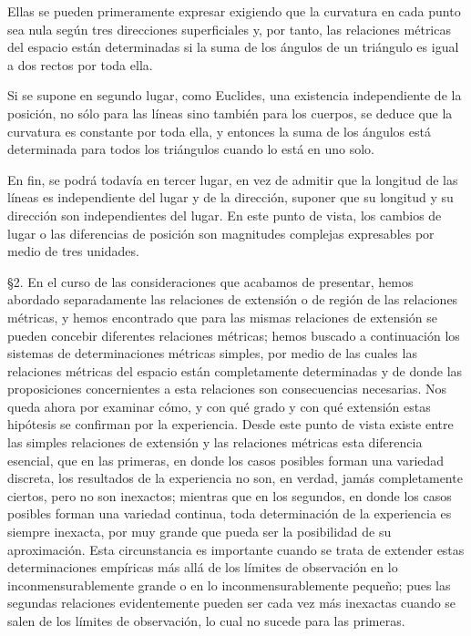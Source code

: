 \documentclass[a4paper, 12pt]{article}
\begin{document}
Ellas se pueden primeramente expresar exigiendo que la curvatura en cada punto sea nula según tres direcciones superficiales y, por tanto, las relaciones métricas del espacio están determinadas si la suma de los ángulos de un triángulo es igual a dos rectos por toda ella.

Si se supone en segundo lugar, como Euclides, una existencia independiente de la posición, no sólo para las líneas sino también para los cuerpos, se deduce que la curvatura es constante por toda ella, y entonces la suma de los ángulos está determinada para todos los triángulos cuando lo está en uno solo.
   
En fin, se podrá todavía en tercer lugar, en vez de admitir que la longitud de las líneas es independiente del lugar y de la dirección, suponer que su longitud y su dirección son independientes del lugar. En este punto de vista, los cambios de lugar o las diferencias de posición son magnitudes complejas expresables por medio de tres unidades.

\bigskip



\S 2.\hspace{3 mm} En el curso de las consideraciones que acabamos de presentar, hemos abordado separadamente las relaciones de extensión o de región de las relaciones métricas, y hemos encontrado que para las mismas relaciones de extensión se pueden concebir diferentes relaciones métricas; hemos buscado a continuación los sistemas de determinaciones métricas simples, por medio de las cuales las relaciones métricas del espacio están completamente determinadas y de donde las proposiciones concernientes a esta relaciones son consecuencias necesarias. Nos queda ahora por examinar cómo, y con qué grado y con qué extensión estas hipótesis se confirman por la experiencia. Desde este punto de vista existe entre las simples relaciones de extensión y las relaciones métricas esta diferencia esencial, que en las primeras, en donde los casos posibles forman una variedad discreta, los resultados de la experiencia no son, en verdad, jamás completamente ciertos, pero no son inexactos; mientras que en los segundos, en donde los casos posibles forman una variedad continua, toda determinación de la experiencia es siempre inexacta, por muy grande que pueda ser la posibilidad de su aproximación. Esta circunstancia es importante cuando se trata de extender estas determinaciones empíricas más allá de los límites de observación en lo inconmensurablemente grande o en lo inconmensurablemente pequeño; pues las segundas relaciones evidentemente pueden ser cada vez más inexactas cuando se salen de los límites de observación, lo cual no sucede para las primeras.
     
\end{document}
